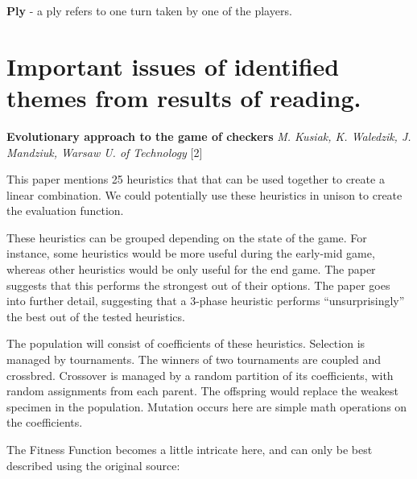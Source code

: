 \documentclass[]{article}
\begin{document}
\textbf{Ply} - a ply refers to one turn taken by one of the players.

\pagebreak

\section{Important issues of identified themes from results of
reading.}\label{important-issues-of-identified-themes-from-results-of-reading.}

\textbf{Evolutionary approach to the game of checkers} \emph{M. Kusiak,
K. Waledzik, J. Mandziuk, Warsaw U. of Technology} {[}2{]}

This paper mentions 25 heuristics that that can be used together to
create a linear combination. We could potentially use these heuristics
in unison to create the evaluation function.

These heuristics can be grouped depending on the state of the game. For
instance, some heuristics would be more useful during the early-mid
game, whereas other heuristics would be only useful for the end game.
The paper suggests that this performs the strongest out of their
options. The paper goes into further detail, suggesting that a 3-phase
heuristic performs ``unsurprisingly'' the best out of the tested
heuristics.

The population will consist of coefficients of these heuristics.
Selection is managed by tournaments. The winners of two tournaments are
coupled and crossbred. Crossover is managed by a random partition of its
coefficients, with random assignments from each parent. The offspring
would replace the weakest specimen in the population. Mutation occurs
here are simple math operations on the coefficients.

The Fitness Function becomes a little intricate here, and can only be
best described using the original source:
\end{document}
